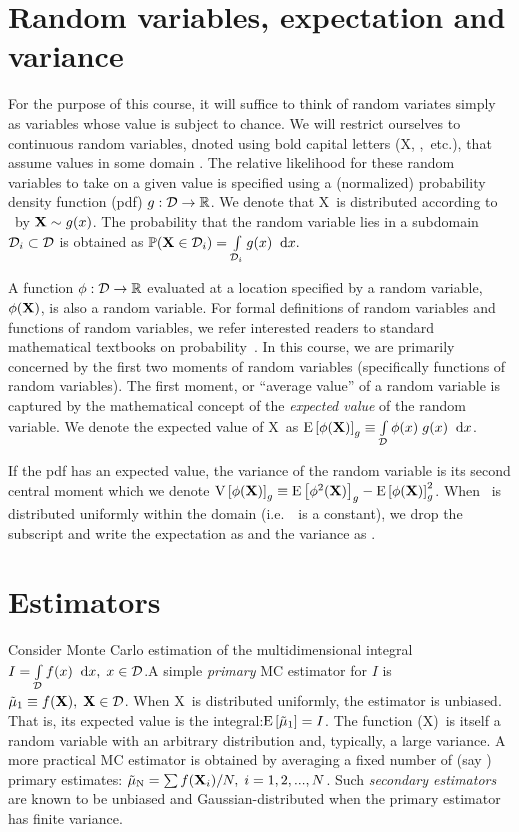 \documentclass[11pt,fleqn]{book} %
\newcommand{\TBC} {\vspace {1em} \noindent [TO BE COMPLETED IN THE FINAL VERSION.] \vspace {1em}}
\begin{document}
\section{Random variables, expectation and variance}
For the purpose of this course, it will suffice to think of random variates simply as variables whose value is subject to chance. We will restrict ourselves to continuous random variables, dnoted using bold capital letters (\RV X, \yii,~etc.), that assume values in some domain \Dom. The relative likelihood for these random variables to take on a given value is specified using a (normalized) probability density function (pdf) $g: \mathcal{D} \rightarrow \mathbb{R}$. We denote that \RV X\ is distributed according to \sdn\ by $\mathbf{X} \sim g(x)$. The probability that the random variable lies in a subdomain $\mathcal{D}_{i} \subset \mathcal{D}$ is obtained as 
  $\mathbb{P}(\mathbf{X} \in \mathcal{D}_{i}) = \int\limits_{\mathcal{D}_{i}}^{} g(x) \;\; \mathrm{d}x.$

A function $\phi:\mathcal{D}\rightarrow\mathbb{R}$ evaluated at a location specified by a random variable, $\phi(\mathbf{X})$, is also a random variable. For formal definitions of random variables and functions of random variables, we refer interested readers to standard mathematical textbooks on probability~\cite{ProbTextBook}.
In this course, we are primarily concerned by the first two moments of random variables (specifically functions of random variables). The first moment, or ``average value'' of a random variable is captured by the mathematical concept of the \textit{expected value} of the random variable. We denote the expected value of \RV X\ as 
$ \mathrm{E} \left[\phi(\mathbf{X}) \right]_{g}   \equiv \int\limits_{\mathcal{D}}^{} \phi(x)\;g(x) \;\; \mathrm{d}x$. 

If the pdf has an expected value, the variance of the random variable is its second central moment which we denote
$\mathrm{V} \left[\phi(\mathbf{X})\right]_{g} \equiv \mathrm{E} \left[\phi^2(\mathbf{X}) \right]_{g} - \mathrm{E} \left[\phi(\mathbf{X}) \right]_{g}^2$. 
When \ is distributed uniformly within the domain (i.e.~\sdn\ is a constant), we drop the subscript and write the expectation as  and the variance as .

\TBC 

\section{Estimators}
Consider Monte Carlo estimation of the multidimensional integral $ I = \int\limits_{\mathcal{D}}^{} f(x) \;\; \mathrm{d}x, \; x\in\mathcal{D} $.A simple \emph{primary} MC estimator for $I$ is
$\tilde\mu_\mathrm{1}\equiv f(\mathbf{X}) , \;\mathbf{X} \in \mathcal{D}$. When \RV X\ is distributed
uniformly, the estimator is unbiased. That is, its expected value is the integral:$\mathrm{E} \left[\tilde\mu_\mathrm{1} \right]=I$. The function \ifsym(\RV X)\ is itself a random variable with an arbitrary distribution and, typically, a large variance. A more practical MC estimator is obtained by averaging a fixed number of (say \N) primary estimates:  $\tilde\mu_\mathrm{N} = \sum f(\mathbf{X} _i)/N, \; i=1,2,...,N$. Such \emph{secondary estimators}  are known to be unbiased and Gaussian-distributed when the primary estimator has finite variance. 
\end{document}
